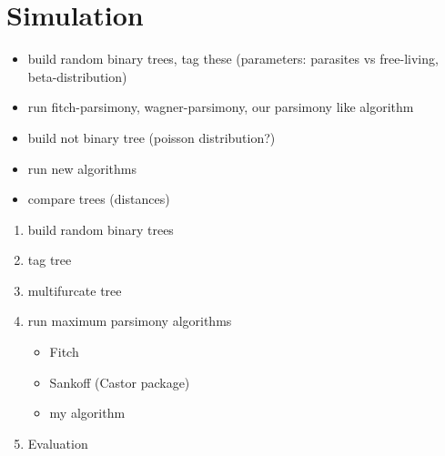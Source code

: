   \section{Simulation}
    \begin{itemize}
      \item build random binary trees, tag these (parameters: parasites vs free-living, 
        beta-distribution)
      \item run fitch-parsimony, wagner-parsimony, our parsimony like algorithm
      \item build not binary tree (poisson distribution?)
      \item run new algorithms
      \item compare trees (distances)
    \end{itemize}

    \begin{enumerate}
      \item build random binary trees
      \item tag tree
      \item multifurcate tree
      \item run maximum parsimony algorithms
      \begin{itemize}
        \item Fitch
        \item Sankoff (Castor package)
        \item my algorithm
      \end{itemize}
      \item Evaluation
    \end{enumerate}

